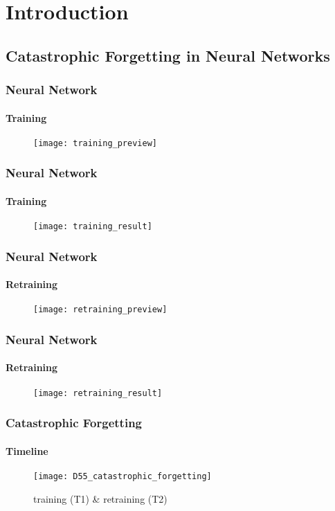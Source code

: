 \section{Introduction}

        \subsection{Catastrophic Forgetting in Neural Networks}

        \begin{frame}
            \frametitle{Neural Network}
            \framesubtitle{Training}

            \begin{figure}[H]
                \centering
                \texttt{[image: training\_preview]}
            \end{figure}
        \end{frame}
        \begin{frame}
            \frametitle{Neural Network}
            \framesubtitle{Training}

            \begin{figure}[H]
                \centering
                \texttt{[image: training\_result]}
            \end{figure}
        \end{frame}

        \begin{frame}
            \frametitle{Neural Network}
            \framesubtitle{Retraining}

            \begin{figure}[H]
                \centering
                \texttt{[image: retraining\_preview]}
            \end{figure}
        \end{frame}
        \begin{frame}
            \frametitle{Neural Network}
            \framesubtitle{Retraining}

            \begin{figure}[H]
                \centering
                \texttt{[image: retraining\_result]}
            \end{figure}
        \end{frame}


        \begin{frame}
            \frametitle{Catastrophic Forgetting}
            \framesubtitle{Timeline}

            \begin{figure}[H]
                \centering
                \texttt{[image: D55\_catastrophic\_forgetting]}
                \caption{training (T1) \& retraining (T2)}
                \label{fig:CF_D55}
            \end{figure}
        \end{frame}

